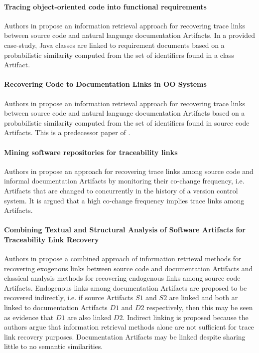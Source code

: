 \paragraph*{Tracing object-oriented code into functional requirements} 
Authors in \cite{AntoniolCCDM00}
propose an information retrieval approach for recovering trace links between source code and natural language documentation \glspl{Artifact}.
In a provided case-study, \gls{Java} classes are linked to requirement documents based on a probabilistic similarity computed from the set of identifiers found in a class \gls{Artifact}.

\paragraph*{Recovering Code to Documentation Links in OO Systems}
Authors in \cite{AntoniolCDLM99}
propose an information retrieval approach for recovering trace links between source code and natural language documentation \glspl{Artifact} based on a  probabilistic similarity computed from the set of identifiers found in source code \glspl{Artifact}.
This is a predecessor paper of \cite{AntoniolCCDM00}.

\paragraph*{Mining software repositories for traceability links}
Authors in \cite{KagdiMS07}
propose an approach for recovering trace links among source code and informal documentation \glspl{Artifact} by monitoring their co-change frequency, i.e. \glspl{Artifact} that are changed to concurrently in the history of a version control system.
It is argued that a high co-change frequency implies trace links among \glspl{Artifact}.

\paragraph*{Combining Textual and Structural Analysis of Software Artifacts for  Traceability Link Recovery}
Authors in \cite{McMillanPR2009}
propose a combined approach of information retrieval methods for recovering exogenous links between source code and documentation \glspl{Artifact} and classical analysis methods for recovering endogenous links among source code \glspl{Artifact}.
Endogenous links among documentation \glspl{Artifact} are proposed to be recovered indirectly, i.e. if source \glspl{Artifact} $S1$ and $S2$ are linked and both ar linked to documentation \glspl{Artifact} $D1$ and $D2$ respectively, then this may be seen as evidence that $D1$ are also linked $D2$.
Indirect linking is proposed because the authors argue that information retrieval methods alone are not sufficient for trace link recovery purposes.
Documentation \glspl{Artifact} may be linked despite sharing little to no semantic similarities.

